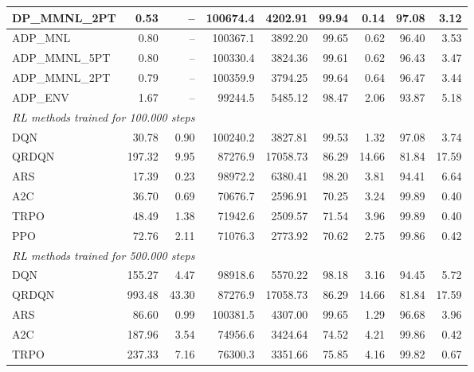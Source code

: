 \begin{samepage}
\begin{center}
\begin{tabular}{l|rr|rr|rr|rr}
    DP\_MMNL\_2PT &     0.53 &    -- &   100674.4 &    4202.91 &   99.94 &    0.14 &   97.08 &    3.12 \\
    \midrule
    ADP\_MNL     &     0.80 &    -- &   100367.1 &    3892.20 &   99.65 &    0.62 &   96.40 &    3.53 \\
    ADP\_MMNL\_5PT &     0.80 &    -- &   100330.4 &    3824.36 &   99.61 &    0.62 &   96.43 &    3.47 \\
    ADP\_MMNL\_2PT &     0.79 &    -- &   100359.9 &    3794.25 &   99.64 &    0.64 &   96.47 &    3.44 \\
    ADP\_ENV     &     1.67 &    -- &    99244.5 &    5485.12 &   98.47 &    2.06 &   93.87 &    5.18 \\
    \midrule
    \multicolumn{9}{l}{\textit{RL methods trained for 100.000 steps}} \\
    \midrule
    DQN          &    30.78 &     0.90 &   100240.2 &    3827.81 &   99.53 &    1.32 &   97.08 &    3.74 \\
    QRDQN        &   197.32 &     9.95 &    87276.9 &   17058.73 &   86.29 &   14.66 &   81.84 &   17.59 \\
    ARS          &    17.39 &     0.23 &    98972.2 &    6380.41 &   98.20 &    3.81 &   94.41 &    6.64 \\
    A2C          &    36.70 &     0.69 &    70676.7 &    2596.91 &   70.25 &    3.24 &   99.89 &    0.40 \\
    TRPO         &    48.49 &     1.38 &    71942.6 &    2509.57 &   71.54 &    3.96 &   99.89 &    0.40 \\
    PPO          &    72.76 &     2.11 &    71076.3 &    2773.92 &   70.62 &    2.75 &   99.86 &    0.42 \\
    \midrule
    \multicolumn{9}{l}{\textit{RL methods trained for 500.000 steps}} \\
    \midrule
    DQN          &   155.27 &     4.47 &    98918.6 &    5570.22 &   98.18 &    3.16 &   94.45 &    5.72 \\
    QRDQN        &   993.48 &    43.30 &    87276.9 &   17058.73 &   86.29 &   14.66 &   81.84 &   17.59 \\
    ARS          &    86.60 &     0.99 &   100381.5 &    4307.00 &   99.65 &    1.29 &   96.68 &    3.96 \\
    A2C          &   187.96 &     3.54 &    74956.6 &    3424.64 &   74.52 &    4.21 &   99.86 &    0.42 \\
    TRPO         &   237.33 &     7.16 &    76300.3 &    3351.66 &   75.85 &    4.16 &   99.82 &    0.67 \\

\end{tabular}
\end{center}
\end{samepage}

